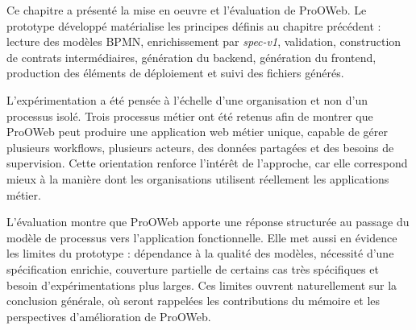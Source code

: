 
Ce chapitre a présenté la mise en oeuvre et l'évaluation de ProOWeb. Le prototype développé matérialise les principes définis au chapitre précédent : lecture des modèles BPMN, enrichissement par \textit{spec-v1}, validation, construction de contrats intermédiaires, génération du backend, génération du frontend, production des éléments de déploiement et suivi des fichiers générés.

L'expérimentation a été pensée à l'échelle d'une organisation et non d'un processus isolé. Trois processus métier ont été retenus afin de montrer que ProOWeb peut produire une application web métier unique, capable de gérer plusieurs workflows, plusieurs acteurs, des données partagées et des besoins de supervision. Cette orientation renforce l'intérêt de l'approche, car elle correspond mieux à la manière dont les organisations utilisent réellement les applications métier.

L'évaluation montre que ProOWeb apporte une réponse structurée au passage du modèle de processus vers l'application fonctionnelle. Elle met aussi en évidence les limites du prototype : dépendance à la qualité des modèles, nécessité d'une spécification enrichie, couverture partielle de certains cas très spécifiques et besoin d'expérimentations plus larges. Ces limites ouvrent naturellement sur la conclusion générale, où seront rappelées les contributions du mémoire et les perspectives d'amélioration de ProOWeb.
